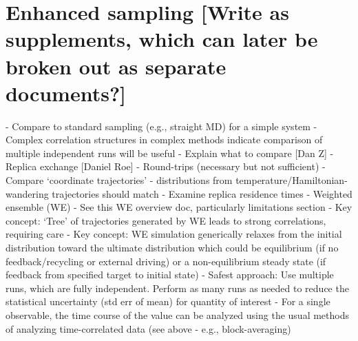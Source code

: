 \section{Enhanced sampling [Write as supplements, which can later be broken out as separate documents?]}
- Compare to standard sampling (e.g., straight MD) for a simple system
- Complex correlation structures in complex methods indicate comparison of multiple independent runs will be useful
    - Explain what to compare [Dan Z]
- Replica exchange [Daniel Roe]
    - Round-trips (necessary but not sufficient)
    - Compare ‘coordinate trajectories’ - distributions from temperature/Hamiltonian-wandering trajectories should match
    - Examine replica residence times
- Weighted ensemble (WE)
    - See this WE overview doc, particularly limitations section
    - Key concept: ‘Tree’ of trajectories generated by WE leads to strong correlations, requiring care
    - Key concept: WE simulation generically relaxes from the initial distribution toward the ultimate distribution which could be equilibrium (if no feedback/recycling or external driving) or a non-equilibrium steady state (if feedback from specified target to initial state)
    - Safest approach: Use multiple runs, which are fully independent.  Perform as many runs as needed to reduce the statistical uncertainty (std err of mean) for quantity of interest
    - For a single observable, the time course of the value can be analyzed using the usual methods of analyzing time-correlated data (see above - e.g., block-averaging)


